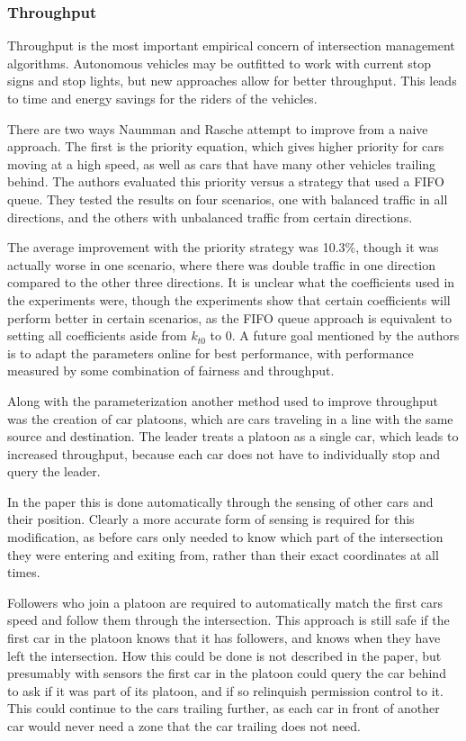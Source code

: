 \documentclass[12pt]{article}
\begin{document}
\subsubsection{Throughput}
Throughput is the most important empirical concern of intersection management algorithms. Autonomous vehicles may be outfitted to work with current stop signs and stop lights, but new approaches allow for better throughput. This leads to time and energy savings for the riders of the vehicles.\par
There are two ways Naumman and Rasche attempt to improve from a naive approach. The first is the priority equation, which gives higher priority for cars moving at a high speed, as well as cars that have many other vehicles trailing behind. The authors evaluated this priority versus a strategy that used a FIFO queue. They tested the results on four scenarios, one with balanced traffic in all directions, and the others with unbalanced traffic from certain directions. \par
The average improvement with the priority strategy was 10.3\%, though it was actually worse in one scenario, where there was double traffic in one direction compared to the other three directions. It is unclear what the coefficients used in the experiments were, though the experiments show that certain coefficients will perform better in certain scenarios, as the FIFO queue approach is equivalent to setting all coefficients aside from $k_{t0}$ to 0. A future goal mentioned by the authors is to adapt the parameters online for best performance, with performance measured by some combination of fairness and throughput.\par
Along with the parameterization another method used to improve throughput was the creation of car platoons, which are cars traveling in a line with the same source and destination. The leader treats a platoon as a single car, which leads to increased throughput, because each car does not have to individually stop and query the leader. \par
In the paper this is done automatically through the sensing of other cars and their position. Clearly a more accurate form of sensing is required for this modification, as before cars only needed to know which part of the intersection they were entering and exiting from, rather than their exact coordinates at all times. \par
Followers who join a platoon are required to automatically match the first cars speed and follow them through the intersection. This approach is still safe if the first car in the platoon knows that it has followers, and knows when they have left the intersection. How this could be done is not described in the paper, but presumably with sensors the first car in the platoon could query the car behind to ask if it was part of its platoon, and if so relinquish permission control to it. This could continue to the cars trailing further, as each car in front of another car would never need a zone that the car trailing does not need.\par
\end{document}

